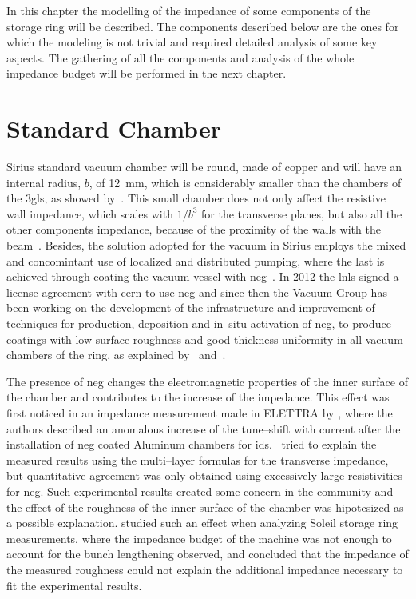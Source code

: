    In this chapter the modelling of the impedance of some components of the storage ring will be described. The components described below are the ones for which the modeling is not trivial and required detailed analysis of some key aspects. The gathering of all the components and analysis of the whole impedance budget will be performed in the next chapter.

\section{Standard Chamber}

    Sirius standard vacuum chamber will be round, made of copper and will have an internal radius, $b$, of \SI{12}{\milli\meter}, which is considerably smaller than the chambers of the \gls{3gls}, as showed by~.
    This small chamber does not only affect the resistive wall impedance, which scales with $1/b^3$ for the transverse planes, but also all the other components impedance, because of the proximity of the walls with the beam~\cite{Nagaoka2014}. Besides, the solution adopted for the vacuum in Sirius employs the mixed and concomintant use of localized and distributed pumping, where the last is achieved through coating the vacuum vessel with \gls{neg}~\cite{Benvenuti1998,Prodromides2002}. In 2012 the \gls{lnls} signed a license agreement with \gls{cern} to use \gls{neg} and since then the Vacuum Group has been working on the development of the infrastructure and improvement of techniques for production, deposition and in--situ activation of \gls{neg}, to produce coatings with low surface roughness and good thickness uniformity in all vacuum chambers of the ring, as explained by~ and~.

    The presence of \gls{neg} changes the electromagnetic properties of the inner surface of the chamber and contributes to the increase of the impedance. This effect was first noticed in an impedance measurement made in ELETTRA by , where the authors described an anomalous increase of the tune--shift with current after the installation of \gls{neg} coated Aluminum chambers for \gls{ids}.~ tried to explain the measured results using the multi--layer formulas for the transverse impedance, but quantitative agreement was only obtained using excessively large resistivities for \gls{neg}. Such experimental results created some concern in the community and the effect of the roughness of the inner surface of the chamber was hipotesized as a possible explanation.  studied such an effect when analyzing Soleil storage ring measurements, where the impedance budget of the machine was not enough to account for the bunch lengthening observed, and concluded that the impedance of the measured roughness could not explain the additional impedance necessary to fit the experimental results.

